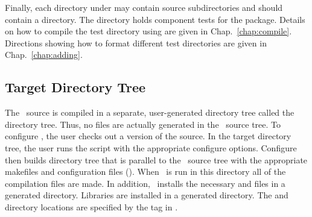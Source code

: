 Finally, each directory under  may contain source
subdirectories and should contain a  directory.  The
 directory holds component tests for the package.  Details
on how to compile the test directory using  are given
in Chap.~\ref{chap:compile}.  Directions showing how to format
different test directories are given in Chap.~\ref{chap:adding}.

\subsection{Target Directory Tree}

The \draco\ source is compiled in a separate, user-generated directory
tree called the  directory tree.  Thus, no files are
actually generated in the \draco\ source tree.  To configure \draco,
the user checks out a version of the source.  In the target directory
tree, the user runs the  script with the
appropriate configure options.  Configure then builds directory tree
that is parallel to the \draco\ source tree with the appropriate
makefiles and configuration files ().  When \gmake\ is
run in this directory all of the compilation files are made.  In
addition, \gmake\ installs the necessary  and 
files in a generated  directory.  Libraries are
installed in a generated  directory.  The 
and  directory locations are specified by the
 tag in \autoconf.

